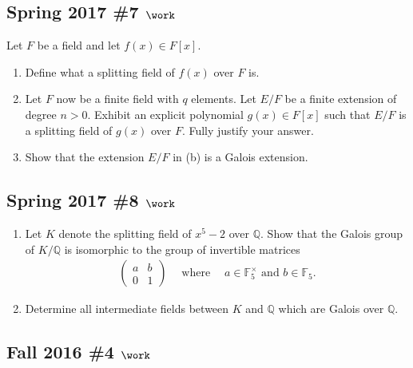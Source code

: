 \hypertarget{spring-2017-7-work}{%
\subsection{\texorpdfstring{Spring 2017 \#7
\(\work\)}{Spring 2017 \#7 \textbackslash work}}\label{spring-2017-7-work}}

Let \(F\) be a field and let \(f(x) \in F[x]\).

\begin{enumerate}
\def\labelenumi{\alph{enumi}.}
\item
  Define what a splitting field of \(f(x)\) over \(F\) is.
\item
  Let \(F\) now be a finite field with \(q\) elements. Let \(E/F\) be a
  finite extension of degree \(n>0\). Exhibit an explicit polynomial
  \(g(x) \in F[x]\) such that \(E/F\) is a splitting field of \(g(x)\)
  over \(F\). Fully justify your answer.
\item
  Show that the extension \(E/F\) in (b) is a Galois extension.
\end{enumerate}

\hypertarget{spring-2017-8-work}{%
\subsection{\texorpdfstring{Spring 2017 \#8
\(\work\)}{Spring 2017 \#8 \textbackslash work}}\label{spring-2017-8-work}}

\begin{enumerate}
\def\labelenumi{\alph{enumi}.}
\item
  Let \(K\) denote the splitting field of \(x^5 - 2\) over
  \({\mathbb{Q}}\). Show that the Galois group of \(K/{\mathbb{Q}}\) is
  isomorphic to the group of invertible matrices
  \begin{align*}
  \left(\begin{array}{ll}
  a & b \\
  0 & 1
  \end{array}\right) 
  {\quad \operatorname{where} \quad} a\in {\mathbb{F}}_5^{\times}\text{ and } b\in {\mathbb{F}}_5
  .\end{align*}
\item
  Determine all intermediate fields between \(K\) and \({\mathbb{Q}}\)
  which are Galois over \({\mathbb{Q}}\).
\end{enumerate}

\hypertarget{fall-2016-4-work}{%
\subsection{\texorpdfstring{Fall 2016 \#4
\(\work\)}{Fall 2016 \#4 \textbackslash work}}\label{fall-2016-4-work}}


